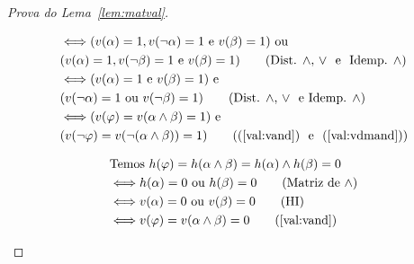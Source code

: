 \begin{proof}[Prova do Lema~\ref{lem:matval}]
\begin{provaporcasos}
\begin{provaporsubcasos}
\begin{align*}
                        &\Longleftrightarrow (v(\alpha) = 1, v(\neg \alpha) = 1 \text{ e } v(\beta) = 1) \text{ ou }\\&(v(\alpha) = 1, v(\neg \beta) = 1 \text{ e } v(\beta) = 1) \tag*{(Dist. $\land$, $\lor$ \text{ e } Idemp. $\land$)}\\
                        &\Longleftrightarrow (v(\alpha) = 1 \text{ e } v(\beta) = 1) \text{ e } \\&(v(\neg \alpha) = 1 \text{ ou } v(\neg \beta) = 1) \tag*{(Dist. $\land$, $\lor$ \text{ e }Idemp. $\land$)}\\
                        &\Longleftrightarrow (v(\phi) = v(\alpha \land \beta) = 1) \text{ e } \\&(v(\neg \phi) = v(\neg (\alpha \land \beta)) = 1) \tag*{((\ref{val:vand}) \text{ e } (\ref{val:vdmand}))}
                    \end{align*}

                    \begin{align*}
                        &\text{Temos } h(\phi) = h(\alpha \land \beta) = h(\alpha) \land h(\beta) = 0\\
                        &\Longleftrightarrow h(\alpha) = 0\text{ ou }h(\beta) = 0\tag*{(Matriz de $\land$)}\\
                        &\Longleftrightarrow v(\alpha) = 0\text{ ou }v(\beta) = 0 \tag*{(HI)}\\
                        &\Longleftrightarrow v(\phi) = v(\alpha \land \beta) = 0\tag*{(\ref{val:vand})}
                    \end{align*}

                \end{provaporsubcasos}

                \vspace{\baselineskip}



\end{provaporcasos}
\end{proof}
